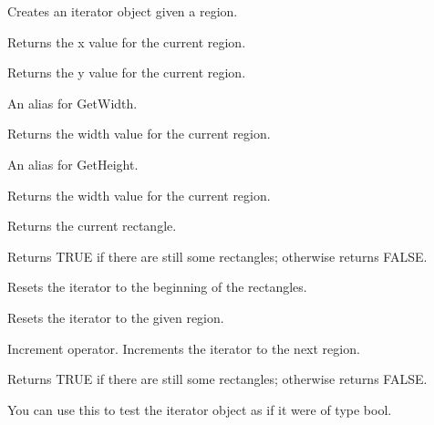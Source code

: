 Creates an iterator object given a region.



Returns the x value for the current region.



Returns the y value for the current region.



An alias for GetWidth.



Returns the width value for the current region.



An alias for GetHeight.



Returns the width value for the current region.



Returns the current rectangle.



Returns TRUE if there are still some rectangles; otherwise returns FALSE.



Resets the iterator to the beginning of the rectangles.


Resets the iterator to the given region.



Increment operator. Increments the iterator to the next region.



Returns TRUE if there are still some rectangles; otherwise returns FALSE.

You can use this to test the iterator object as if it were of type bool.

